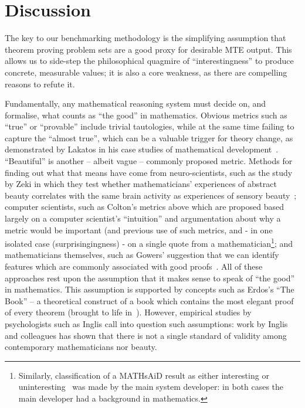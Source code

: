 

\section{Discussion}
\label{sec:discussion}

The key to our benchmarking methodology is the simplifying assumption that
theorem proving problem sets are a good proxy for desirable MTE output. This
allows us to side-step the philosophical quagmire of ``interestingness'' to
produce concrete, measurable values; it is also a core weakness, as there are
compelling reasons to refute it.

Fundamentally, any mathematical reasoning system must decide on, and formalise,
what counts as ``the good'' in mathematics.  Obvious metrics such as ``true'' or
``provable'' include trivial tautologies, while at the same time failing to
capture the ``almost true'', which can be a valuable trigger for theory change,
as demonstrated by Lakatos in his case studies of mathematical
development~\cite{lakatos}. ``Beautiful'' is another -- albeit vague -- commonly
proposed metric. Methods for finding out what that means have come from
neuro-scientists, such as the study by Zeki \etal{} in which they test whether
mathematicians' experiences of abstract beauty correlates with the same brain
activity as experiences of sensory beauty~\cite{zeki}; computer scientists, such
as Colton's metrics above which are proposed based largely on a computer
scientist's ``intuition'' and argumentation about why a metric would be
important (and previous use of such metrics, and - in one isolated case
(surprisingingness) - on a single quote from a mathematician\footnote{Similarly,
  classification of a MATHsAiD result as either interesting or
  uninteresting~\cite{roy} was made by the main system developer: in both cases
  the main developer had a background in mathematics.}; and mathematicians
themselves, such as Gowers' suggestion that we can identify features which are
commonly associated with good proofs~\cite{gowers}. All of these approaches rest
upon the assumption that it makes sense to speak of ``the good'' in mathematics.
This assumption is supported by concepts such as Erdos's ``The Book'' -- a
theoretical construct of a book which contains the most elegant proof of every
theorem (brought to life in~\cite{aigner2010proofs}). However, empirical studies
by psychologists such as Inglis call into question such assumptions: work by
Inglis and colleagues has shown that there is not a single standard of validity
among contemporary mathematicians %
nor beauty. %

